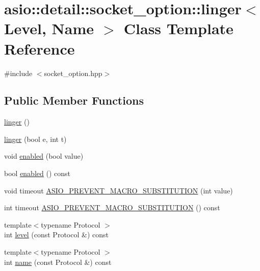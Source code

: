 \hypertarget{classasio_1_1detail_1_1socket__option_1_1linger}{}\section{asio\+:\+:detail\+:\+:socket\+\_\+option\+:\+:linger$<$ Level, Name $>$ Class Template Reference}
\label{classasio_1_1detail_1_1socket__option_1_1linger}


{\ttfamily \#include $<$socket\+\_\+option.\+hpp$>$}

\subsection*{Public Member Functions}
\begin{DoxyCompactItemize}
\item 
\hyperlink{classasio_1_1detail_1_1socket__option_1_1linger_a3ba41e1cb8fdaac33e80cee84dd8992a}{linger} ()
\item 
\hyperlink{classasio_1_1detail_1_1socket__option_1_1linger_a088aedf18b1829ac36b1d2c3c3dcb493}{linger} (bool e, int t)
\item 
void \hyperlink{classasio_1_1detail_1_1socket__option_1_1linger_abaae7be14cced58cde693ae252896d16}{enabled} (bool value)
\item 
bool \hyperlink{classasio_1_1detail_1_1socket__option_1_1linger_ae9f37998d2960fc7eee0e1c07c6de3ee}{enabled} () const 
\item 
void timeout \hyperlink{classasio_1_1detail_1_1socket__option_1_1linger_abfde048b1b715dc6d8b4ee4793d0e0dd}{A\+S\+I\+O\+\_\+\+P\+R\+E\+V\+E\+N\+T\+\_\+\+M\+A\+C\+R\+O\+\_\+\+S\+U\+B\+S\+T\+I\+T\+U\+T\+I\+O\+N} (int value)
\item 
int timeout \hyperlink{classasio_1_1detail_1_1socket__option_1_1linger_a6b2e4f1a0ed83dab648e1d47544ebdac}{A\+S\+I\+O\+\_\+\+P\+R\+E\+V\+E\+N\+T\+\_\+\+M\+A\+C\+R\+O\+\_\+\+S\+U\+B\+S\+T\+I\+T\+U\+T\+I\+O\+N} () const 
\item 
{\footnotesize template$<$typename Protocol $>$ }\\int \hyperlink{classasio_1_1detail_1_1socket__option_1_1linger_a198b756adbf617b542462516a63df814}{level} (const Protocol \&) const 
\item 
{\footnotesize template$<$typename Protocol $>$ }\\int \hyperlink{classasio_1_1detail_1_1socket__option_1_1linger_a79bf1bc1d3e1cf2229550f64cbf6d2d3}{name} (const Protocol \&) const 

\end{DoxyCompactItemize}
